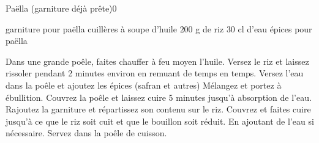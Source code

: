 \begin{recette}{Paëlla (garniture déjà prête)}{0}{}{}
\begin{ingredients}
\ingredient garniture pour paëlla
 cuillères à soupe d'huile
\ingredient $200$ g de riz
\ingredient $30$ cl d'eau
\ingredient épices pour paëlla
\end{ingredients}

\begin{preparation}
\etape Dans une grande poêle, faites chauffer à feu moyen l'huile.
\etape Versez le riz et laissez rissoler pendant 2 minutes environ en remuant de temps en temps.
\etape Versez l'eau dans la poêle et ajoutez les épices (safran et autres)
\etape Mélangez et portez à ébullition. Couvrez la poêle et laissez cuire 5 minutes jusqu'à absorption de l'eau.
\etape Rajoutez la garniture et répartissez son contenu sur le riz. Couvrez et faites cuire jusqu'à ce que le riz soit cuit et que le bouillon soit réduit. En ajoutant de l'eau si nécessaire.
\etape Servez dans la poêle de cuisson.
\end{preparation}

\end{recette}

